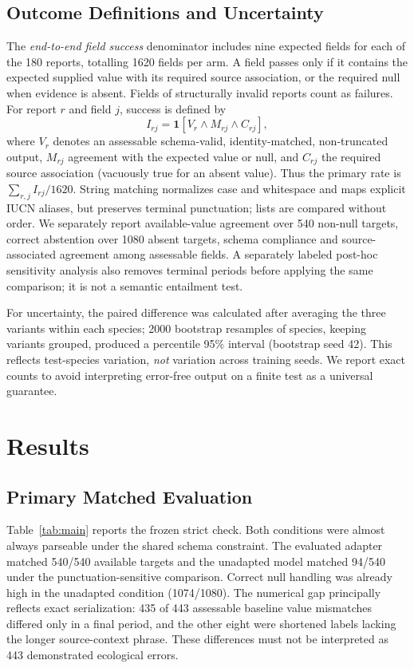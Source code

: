 \documentclass[a4paper,conference,10pt]{IEEEtran}
\begin{document}
\subsection{Outcome Definitions and Uncertainty}
The \emph{end-to-end field success} denominator includes nine expected fields for each of the 180 reports, totalling 1620 fields per arm. A field passes only if it contains the expected supplied value with its required source association, or the required null when evidence is absent. Fields of structurally invalid reports count as failures. For report $r$ and field $j$, success is defined by
\begin{equation}
\label{eq:criterion}
I_{rj}=\mathbf{1}[V_r\land M_{rj}\land C_{rj}],
\end{equation}
where $V_r$ denotes an assessable schema-valid, identity-matched, non-truncated output, $M_{rj}$ agreement with the expected value or null, and $C_{rj}$ the required source association (vacuously true for an absent value). Thus the primary rate is $\sum_{r,j}I_{rj}/1620$. String matching normalizes case and whitespace and maps explicit IUCN aliases, but preserves terminal punctuation; lists are compared without order. We separately report available-value agreement over 540 non-null targets, correct abstention over 1080 absent targets, schema compliance and source-associated agreement among assessable fields. A separately labeled post-hoc sensitivity analysis also removes terminal periods before applying the same comparison; it is not a semantic entailment test.

For uncertainty, the paired difference was calculated after averaging the three variants within each species; 2000 bootstrap resamples of species, keeping variants grouped, produced a percentile 95\% interval (bootstrap seed 42). This reflects test-species variation, \emph{not} variation across training seeds. We report exact counts to avoid interpreting error-free output on a finite test as a universal guarantee.

\section{Results}
\subsection{Primary Matched Evaluation}
Table~\ref{tab:main} reports the frozen strict check. Both conditions were almost always parseable under the shared schema constraint. The evaluated adapter matched 540/540 available targets and the unadapted model matched 94/540 under the punctuation-sensitive comparison. Correct null handling was already high in the unadapted condition (1074/1080). The numerical gap principally reflects exact serialization: 435 of 443 assessable baseline value mismatches differed only in a final period, and the other eight were shortened labels lacking the longer source-context phrase. These differences must not be interpreted as 443 demonstrated ecological errors.
\end{document}
